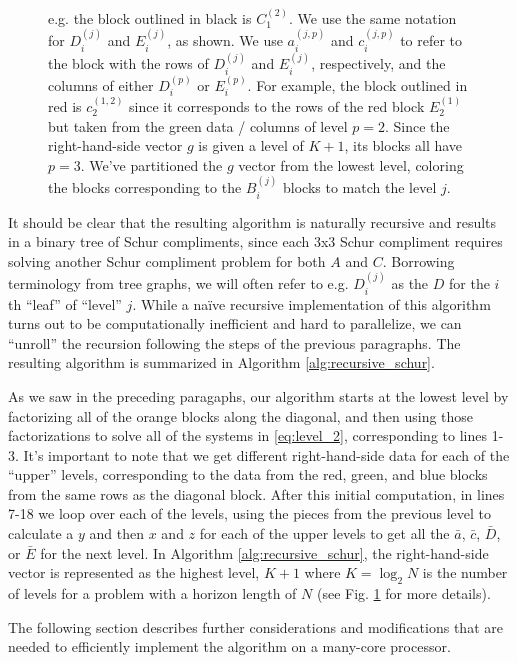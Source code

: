 \documentclass[../root.tex]{subfiles}
\newcommand{\0}{{\transparent{0} \resizebox{\mycellheight}{\mycellheight}{0}}}
\begin{document}
\begin{figure}
{        e.g.  the block outlined in black is $C_1^{(2)}$. We use the same notation for
        $D_i^{(j)}$ and $E_i^{(j)}$, as shown. We use $a_i^{(j,p)}$ and $c_i^{(j,p)}$ to
        refer to the block with the rows of $D_i^{(j)}$ and $E_i^{(j)}$, respectively, and
        the columns of either $D_i^{(p)}$ or $E_i^{(p)}$. For example, the block outlined in
        red is $c_2^{(1,2)}$ since it corresponds to the rows of the red block $E_2^{(1)}$
        but taken from the green data / columns of level $p=2$. Since the right-hand-side
        vector $g$ is given a level of $K+1$, its blocks all have $p=3$. We've partitioned
        the $g$ vector from the lowest level, coloring the blocks corresponding to the
        $B_i^{(j)}$ blocks to match the level $j$.
    }
    \label{fig:kkt_partitioned}
\end{figure}
It should be clear that the resulting algorithm is naturally recursive and results in a
binary tree of Schur compliments, since each 3x3 Schur compliment requires solving another
Schur compliment problem for both $A$ and $C$. Borrowing terminology from tree graphs, 
we will often refer to e.g. $D_i^{(j)}$ as the $D$ for the $i$th ``leaf'' of ``level'' $j$.
While a na\"ive recursive implementation of
this algorithm turns out to be computationally inefficient and hard to parallelize, we can
``unroll'' the recursion following the steps of the previous paragraphs. The resulting
algorithm is summarized in Algorithm \ref{alg:recursive_schur}. 

As we saw in the preceding paragaphs, our algorithm starts at the lowest level by
factorizing all of the orange blocks along the diagonal, and then using those
factorizations to solve all of the systems in \eqref{eq:level_2}, corresponding to lines
1-3. It's important to note that we get different right-hand-side data for each of the
``upper'' levels, corresponding to the data from the red, green, and blue blocks from the
same rows as the diagonal block.  After this initial computation, in lines 7-18 we loop over
each of the levels, using the pieces from the previous level to calculate a $y$ and then $x$
and $z$ for each of the upper levels to get all the $\bar{a}$, $\bar{c}$,
$\bar{D}$, or $\bar{E}$ for the next level. In Algorithm \ref{alg:recursive_schur}, the
right-hand-side vector is represented as the highest level, $K+1$ where $K = \log_2{N}$ is
the number of levels for a problem with a horizon length of $N$ (see Fig.
\ref{fig:kkt_partitioned} for more details). 

The following section describes further considerations and 
modifications that are needed to efficiently implement the algorithm on a many-core 
processor. 
\end{document}
